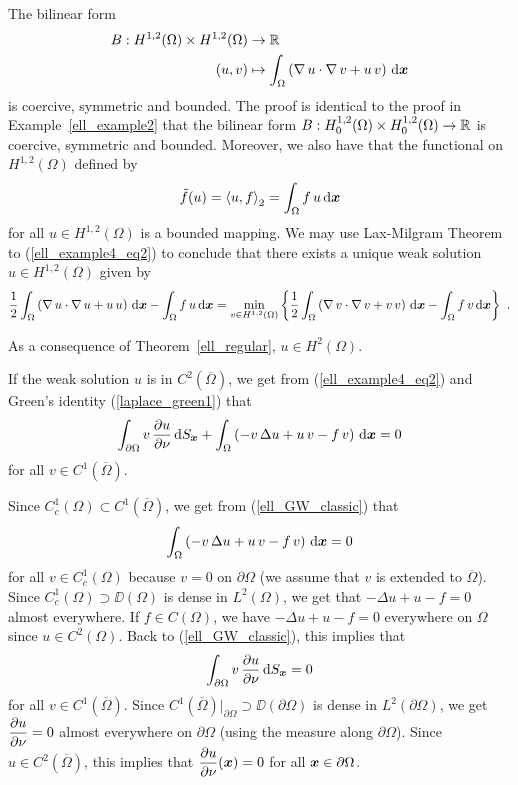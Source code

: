 \begin{egg}
The bilinear form
\begin{align*}
B:H^{1,2}(\Omega)\times H^{1,2}(\Omega) &\rightarrow \mathbb{R} \\
(u,v) &\mapsto \int_\Omega \left( \operatorname{\nabla} u \cdot \operatorname{\nabla} v + u\, v\right)
\,\mathrm{d}{{\bm{x}}}
\end{align*}
is coercive, symmetric and bounded.  The proof is identical to the
proof in Example~\ref{ell_example2} that the bilinear form
$\displaystyle B:H^{1,2}_0(\Omega)\times H^{1,2}_0(\Omega) \rightarrow \mathbb{R}$
is coercive, symmetric and bounded.  Moreover, we also have that the
functional on $\displaystyle H^{1,2}(\Omega)$ defined by 
\[
\tilde{f}(u) = \left\langle{u} , {f}\right\rangle_2 = \int_\Omega f\, u\,\mathrm{d}{{\bm{x}}}
\]
for all $\displaystyle u \in H^{1,2}(\Omega)$ is a bounded mapping.
We may use Lax-Milgram Theorem to
(\ref{ell_example4_eq2}) to conclude that there exists a unique weak
solution $\displaystyle u \in H^{1,2}(\Omega)$ given by
\[
\frac{1}{2} \int_\Omega \left( \graD u \cdot \graD u 
+u\, u \right) \dx{\VEC{x}} -\int_\Omega f\, u \dx{\VEC{x}}
= \min_{v\in H^{1,2}(\Omega)} \left\{ \frac{1}{2}
\int_\Omega \left( \graD v \cdot \graD v 
+v\, v \right) \dx{\VEC{x}} -\int_\Omega f\, v \dx{\VEC{x}} \right\} \ .
\]

As a consequence of Theorem~\ref{ell_regular}, $\displaystyle u\in H^2(\Omega)$.

If the weak solution $u$ is in $\displaystyle C^2(\overline{\Omega})$,
we get from (\ref{ell_example4_eq2}) and Green's identity (\ref{laplace_green1})
that
\begin{equation} \label{ell_GW_classic}
\int_{\partial \Omega} v\,\frac{\partial{u}}{\partial \nu} \,\mathrm{d}{S}_{{\bm{x}}}
+ \int_\Omega \left( - v\, \Delta u + u\, v - f\, v \right) \,\mathrm{d}{{\bm{x}}} = 0
\end{equation}
for all $\displaystyle v \in C^1(\overline{\Omega})$.

Since $\displaystyle C^1_c(\Omega) \subset C^1(\overline{\Omega})$, we get from
(\ref{ell_GW_classic}) that
\[
\int_\Omega \left( - v\, \Delta u + u\, v - f\, v \right) \,\mathrm{d}{{\bm{x}}} = 0
\]
for all $\displaystyle v \in C^1_c(\Omega)$ 
because $v=0$ on $\partial \Omega$ (we assume that $v$ is extended to
$\overline{\Omega}$).  Since $\displaystyle C^1_c(\Omega)
\supset \DD(\Omega)$ is dense in
$\displaystyle L^2(\Omega)$, we get that
$\displaystyle -\Delta u + u - f = 0$ almost
everywhere.  If $f \in C(\Omega)$, we have
$\displaystyle -\Delta u + u -f = 0$ everywhere on $\Omega$ since
$\displaystyle u\in C^2(\Omega)$.  Back to (\ref{ell_GW_classic}),
this implies that
\[
\int_{\partial \Omega} v\,\frac{\partial{u}}{\partial \nu} \,\mathrm{d}{S}_{{\bm{x}}} = 0
\]
for all $\displaystyle v \in C^1(\overline{\Omega})$.
Since $\displaystyle C^1(\overline{\Omega})\big|_{\partial \Omega}
\supset \DD(\partial \Omega)$ is dense in $L^2(\partial \Omega)$,
we get $\displaystyle \frac{\partial{u}}{\partial \nu} =0$ almost everywhere on
$\partial \Omega$ (using the measure along $\partial \Omega$).  Since
$\displaystyle u\in C^2(\overline{\Omega})$, this implies that
$\displaystyle \frac{\partial{u}}{\partial \nu}({\bm{x}}) =0$ for all
${\bm{x}} \in \partial \Omega$.
\end{egg}

